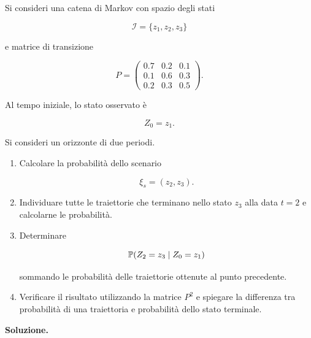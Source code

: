 \begin{exercise}

\label{ex:cap14-traiettoria-markov}

Si consideri una catena di Markov con spazio degli stati

\[
\mathcal I=\{z_1,z_2,z_3\}
\]

\noindent e matrice di transizione

\[
P=
\begin{pmatrix}
0.7 & 0.2 & 0.1\\
0.1 & 0.6 & 0.3\\
0.2 & 0.3 & 0.5
\end{pmatrix}.
\]

Al tempo iniziale, lo stato osservato \`e

\[
Z_0=z_1.
\]

Si consideri un orizzonte di due periodi.

\begin{enumerate}

\item Calcolare la probabilit\`a dello scenario

\[
\xi_s=(z_2,z_3).
\]

\item Individuare tutte le traiettorie che terminano nello stato $z_3$ alla
data $t=2$ e calcolarne le probabilit\`a.

\item Determinare

\[
\mathbb{P}(Z_2=z_3\mid Z_0=z_1)
\]

sommando le probabilit\`a delle traiettorie ottenute al punto precedente.

\item Verificare il risultato utilizzando la matrice $P^2$ e spiegare la
differenza tra probabilit\`a di una traiettoria e probabilit\`a dello stato
terminale.

\end{enumerate}

\end{exercise}

\noindent
\textbf{Soluzione.}

